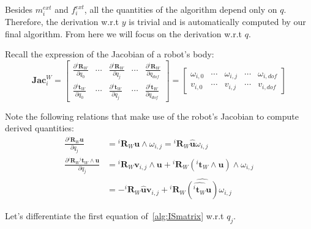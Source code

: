 Besides $m_i^{ext}$ and $f_i^{ext}$, all the quantities of the algorithm depend only on $q$.
Therefore, the derivation w.r.t $y$ is trivial and is automatically computed by our final algorithm.
From here we will focus on the derivation w.r.t $q$.

Recall the expression of the Jacobian of a robot's body:
\begin{equation}
  \mathbf{Jac}^W_i =
  \begin{bmatrix}
    \frac{\partial {}^i\mathbf{R}_W}{\partial q_0} & \cdots &
    \frac{\partial {}^i\mathbf{R}_W}{\partial q_j} & \cdots &
    \frac{\partial {}^i\mathbf{R}_W}{\partial q_{dof}} \\
    \frac{\partial {}^i\mathbf{t}_W}{\partial q_0} & \cdots &
    \frac{\partial {}^i\mathbf{t}_W}{\partial q_j} & \cdots &
    \frac{\partial {}^i\mathbf{t}_W}{\partial q_{dof}}
  \end{bmatrix}
=
  \begin{bmatrix}
    \omega_{i,0} & \cdots &
    \omega_{i,j} & \cdots &
    \omega_{i,dof} \\
    v_{i,0} & \cdots &
    v_{i,j} & \cdots &
    v_{i,dof}
  \end{bmatrix}
\end{equation}

Note the following relations that make use of the robot's Jacobian to compute derived quantities:
\begin{align}
  \frac{\partial {}^i\mathbf{R}_W \mathbf{u}}{\partial q_j}
  &= {}^i\mathbf{R}_W \mathbf{u} \wedge \omega_{i,j}
  = {}^i\mathbf{R}_W \widehat{\mathbf{u}} \omega_{i,j}
  \\
  \frac{\partial {}^i\mathbf{R}_W {}^i\mathbf{t}_W\wedge \mathbf{u}}{\partial q_j}
  &= {}^i\mathbf{R}_W \mathbf{v}_{i,j} \wedge \mathbf{u}
  + {}^i\mathbf{R}_W \left({}^i\mathbf{t}_W\wedge\mathbf{u}\right) \wedge \omega_{i,j}\\
  &= -{}^i\mathbf{R}_W \widehat{\mathbf{u}} \mathbf{v}_{i,j}
  + {}^i\mathbf{R}_W \widehat{\left(\widehat{{}^i\mathbf{t}_W}\mathbf{u}\right)} \omega_{i,j}
\end{align}

Let's differentiate the first equation of~\ref{alg:ISmatrix} w.r.t $q_j$.

